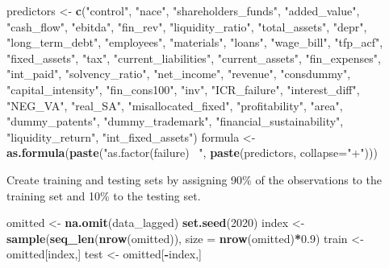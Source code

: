 \documentclass[]{article}
\newenvironment{Shaded}{\begin{snugshade}}{\end{snugshade}}
\newcommand{\DataTypeTok}[1]{\textcolor[rgb]{0.13,0.29,0.53}{#1}}
\newcommand{\DecValTok}[1]{\textcolor[rgb]{0.00,0.00,0.81}{#1}}
\newcommand{\FloatTok}[1]{\textcolor[rgb]{0.00,0.00,0.81}{#1}}
\newcommand{\KeywordTok}[1]{\textcolor[rgb]{0.13,0.29,0.53}{\textbf{#1}}}
\newcommand{\NormalTok}[1]{#1}
\newcommand{\OperatorTok}[1]{\textcolor[rgb]{0.81,0.36,0.00}{\textbf{#1}}}
\newcommand{\StringTok}[1]{\textcolor[rgb]{0.31,0.60,0.02}{#1}}
\begin{document}
\begin{Shaded}
\begin{Highlighting}[]
\NormalTok{predictors <-}\StringTok{ }\KeywordTok{c}\NormalTok{(}\StringTok{"control"}\NormalTok{, }\StringTok{"nace"}\NormalTok{, }\StringTok{"shareholders_funds"}\NormalTok{,}
                \StringTok{"added_value"}\NormalTok{, }\StringTok{"cash_flow"}\NormalTok{, }\StringTok{"ebitda"}\NormalTok{,}
                \StringTok{"fin_rev"}\NormalTok{, }\StringTok{"liquidity_ratio"}\NormalTok{, }\StringTok{"total_assets"}\NormalTok{,}
                \StringTok{"depr"}\NormalTok{, }\StringTok{"long_term_debt"}\NormalTok{, }\StringTok{"employees"}\NormalTok{,}
                \StringTok{"materials"}\NormalTok{, }\StringTok{"loans"}\NormalTok{, }\StringTok{"wage_bill"}\NormalTok{, }\StringTok{"tfp_acf"}\NormalTok{,}
                \StringTok{"fixed_assets"}\NormalTok{, }\StringTok{"tax"}\NormalTok{, }\StringTok{"current_liabilities"}\NormalTok{,}
                \StringTok{"current_assets"}\NormalTok{, }\StringTok{"fin_expenses"}\NormalTok{, }\StringTok{"int_paid"}\NormalTok{,}
                \StringTok{"solvency_ratio"}\NormalTok{, }\StringTok{"net_income"}\NormalTok{, }\StringTok{"revenue"}\NormalTok{,}
                \StringTok{"consdummy"}\NormalTok{, }\StringTok{"capital_intensity"}\NormalTok{, }\StringTok{"fin_cons100"}\NormalTok{,}
                \StringTok{"inv"}\NormalTok{, }\StringTok{"ICR_failure"}\NormalTok{, }\StringTok{"interest_diff"}\NormalTok{, }\StringTok{"NEG_VA"}\NormalTok{,}
                \StringTok{"real_SA"}\NormalTok{, }\StringTok{"misallocated_fixed"}\NormalTok{, }\StringTok{"profitability"}\NormalTok{,}
                \StringTok{"area"}\NormalTok{, }\StringTok{"dummy_patents"}\NormalTok{, }\StringTok{"dummy_trademark"}\NormalTok{,}
                \StringTok{"financial_sustainability"}\NormalTok{, }\StringTok{"liquidity_return"}\NormalTok{,}
                \StringTok{"int_fixed_assets"}\NormalTok{)}
\NormalTok{formula <-}\StringTok{ }\KeywordTok{as.formula}\NormalTok{(}\KeywordTok{paste}\NormalTok{(}\StringTok{"as.factor(failure) ~"}\NormalTok{,}
                            \KeywordTok{paste}\NormalTok{(predictors, }\DataTypeTok{collapse=}\StringTok{"+"}\NormalTok{)))}
\end{Highlighting}
\end{Shaded}

Create training and testing sets by assigning 90\% of the observations
to the training set and 10\% to the testing set.

\begin{Shaded}
\begin{Highlighting}[]
\NormalTok{omitted <-}\StringTok{ }\KeywordTok{na.omit}\NormalTok{(data_lagged)}
\KeywordTok{set.seed}\NormalTok{(}\DecValTok{2020}\NormalTok{)}
\NormalTok{index <-}\StringTok{ }\KeywordTok{sample}\NormalTok{(}\KeywordTok{seq_len}\NormalTok{(}\KeywordTok{nrow}\NormalTok{(omitted)), }\DataTypeTok{size =} \KeywordTok{nrow}\NormalTok{(omitted)}\OperatorTok{*}\FloatTok{0.9}\NormalTok{) }
\NormalTok{train <-}\StringTok{ }\NormalTok{omitted[index,]}
\NormalTok{test <-}\StringTok{ }\NormalTok{omitted[}\OperatorTok{-}\NormalTok{index,]}
\end{Highlighting}
\end{Shaded}
\end{document}
